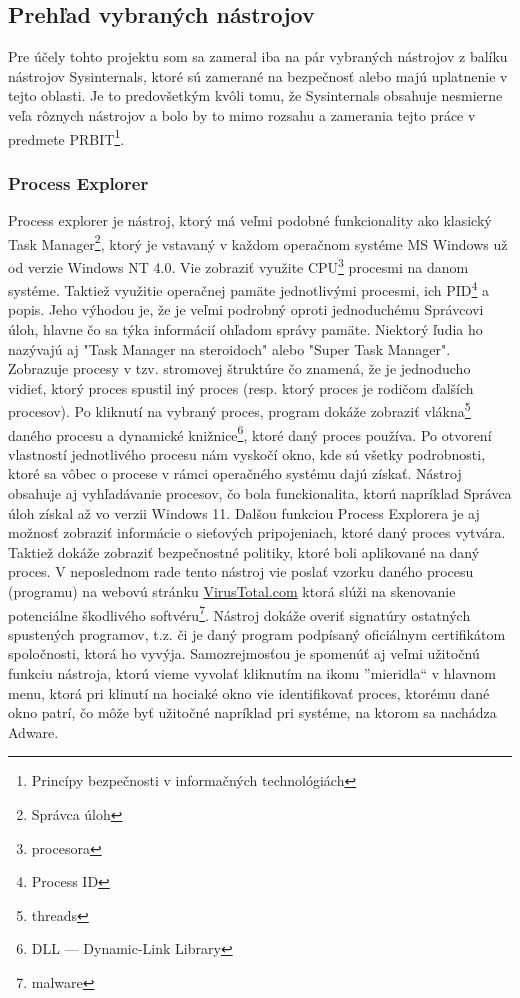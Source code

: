 \documentclass[conference]{IEEEtran}
\begin{document}
\subsection{Prehľad vybraných nástrojov}
Pre účely tohto projektu som sa zameral iba na pár vybraných nástrojov z balíku nástrojov Sysinternals, ktoré sú zamerané na bezpečnosť alebo majú uplatnenie v tejto oblasti. Je to predovšetkým kvôli tomu, že Sysinternals obsahuje nesmierne veľa rôznych nástrojov a bolo by to mimo rozsahu a zamerania tejto práce v predmete PRBIT\footnote{Princípy bezpečnosti v informačných technológiách}.
\subsubsection{Process Explorer}


Process explorer je nástroj, ktorý má veľmi podobné funkcionality ako klasický Task Manager\footnote{Správca úloh}, ktorý je vstavaný v každom operačnom systéme MS Windows už od verzie Windows NT 4.0. Vie zobraziť využite CPU\footnote{procesora} procesmi na danom systéme. Taktiež využitie operačnej pamäte jednotlivými procesmi, ich PID\footnote{Process ID} a popis. Jeho výhodou je, že je veľmi podrobný oproti jednoduchému Správcovi úloh, hlavne čo sa týka informácií ohľadom správy pamäte. Niektorý ľudia ho nazývajú aj "Task Manager na steroidoch" alebo "Super Task Manager". Zobrazuje procesy v tzv. stromovej štruktúre čo znamená, že je jednoducho vidieť, ktorý proces spustil iný proces (resp. ktorý proces je rodičom ďalších procesov). Po kliknutí na vybraný proces, program dokáže zobraziť vlákna\footnote{threads} daného procesu a dynamické knižnice\footnote{DLL --- Dynamic-Link Library}, ktoré daný proces používa. Po otvorení vlastností jednotlivého procesu nám vyskočí okno, kde sú všetky podrobnosti, ktoré sa vôbec o procese v rámci operačného systému dajú získať. Nástroj obsahuje aj vyhľadávanie procesov, čo bola funckionalita, ktorú napríklad Správca úloh získal až vo verzii Windows 11. Dalšou funkciou Process Explorera je aj možnosť zobraziť informácie o sieťových pripojeniach, ktoré daný proces vytvára. Taktiež dokáže zobraziť bezpečnostné politiky, ktoré boli aplikované na daný proces. V neposlednom rade tento nástroj vie poslať vzorku daného procesu (programu) na webovú stránku \href{https://www.virustotal.com/gui/home/upload}{VirusTotal.com} ktorá slúži na skenovanie potenciálne škodlivého softvéru\footnote{malware}. Nástroj dokáže overiť signatúry ostatných spustených programov, t.z. či je daný program podpísaný oficiálnym certifikátom spoločnosti, ktorá ho vyvýja. Samozrejmosťou je spomenúť aj veľmi užitočnú funkciu nástroja, ktorú vieme vyvolať kliknutím na ikonu ''mieridla`` v hlavnom menu, ktorá pri klinutí na hociaké okno vie identifikovať proces, ktorému dané okno patrí, čo môže byť užitočné napríklad pri systéme, na ktorom sa nachádza Adware.
\end{document}
